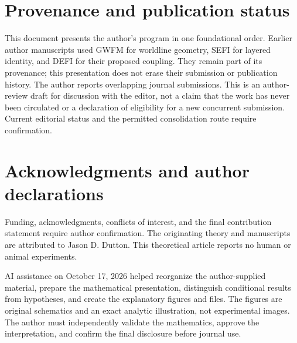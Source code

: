\documentclass[11pt]{article}
\begin{document}
\section*{Provenance and publication status}
This document presents the author's program in one foundational order. Earlier author manuscripts used GWFM for worldline geometry, SEFI for layered identity, and DEFI for their proposed coupling.\cite{gwfm,sefi,defi,sefispace,unified,overview} They remain part of its provenance; this presentation does not erase their submission or publication history. The author reports overlapping journal submissions. This is an author-review draft for discussion with the editor, not a claim that the work has never been circulated or a declaration of eligibility for a new concurrent submission. Current editorial status and the permitted consolidation route require confirmation.

\section*{Acknowledgments and author declarations}
Funding, acknowledgments, conflicts of interest, and the final contribution statement require author confirmation. The originating theory and manuscripts are attributed to Jason D. Dutton. This theoretical article reports no human or animal experiments.

AI assistance on October 17, 2026 helped reorganize the author-supplied material, prepare the mathematical presentation, distinguish conditional results from hypotheses, and create the explanatory figures and files. The figures are original schematics and an exact analytic illustration, not experimental images. The author must independently validate the mathematics, approve the interpretation, and confirm the final disclosure before journal use.
\end{document}

